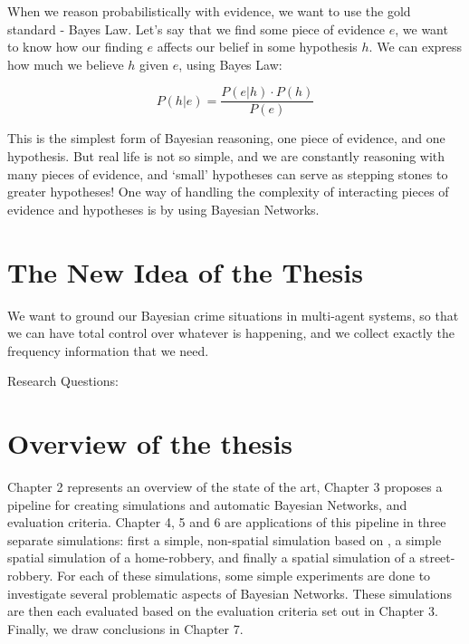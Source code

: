 When we reason probabilistically with evidence, we want to use the gold standard - Bayes Law.
Let's say that we find some piece of evidence $e$, we want to know how our finding $e$ affects our belief in some hypothesis $h$. We can express how much we believe $h$ given $e$, using Bayes Law:

\[ P(h | e) =  \frac{P(e | h) \cdot P(h)}{P(e)}\]


This is the simplest form of Bayesian reasoning, one piece of evidence, and one hypothesis. But real life is not so simple, and we are constantly reasoning with many pieces of evidence, and `small' hypotheses can serve as stepping stones to greater hypotheses! One way of handling the complexity of interacting pieces of evidence and hypotheses is by using Bayesian Networks.

\section{The New Idea of the Thesis}
We want to ground our Bayesian crime situations in multi-agent systems, so that we can have total control over whatever is happening, and we collect exactly the frequency information that we need.

Research Questions:


\section{Overview of the thesis}
Chapter 2 represents an overview of the state of the art, Chapter 3 proposes a pipeline for creating simulations and automatic Bayesian Networks, and evaluation criteria. Chapter 4, 5 and 6 are applications of this pipeline in three separate simulations: first a simple, non-spatial simulation based on \citep{Vlek2015}, a simple spatial simulation of a home-robbery, and finally a spatial simulation of a street-robbery. For each of these simulations, some simple experiments are done to investigate several problematic aspects of Bayesian Networks. These simulations are then each evaluated based on the evaluation criteria set out in Chapter 3. Finally, we draw conclusions in Chapter 7.
